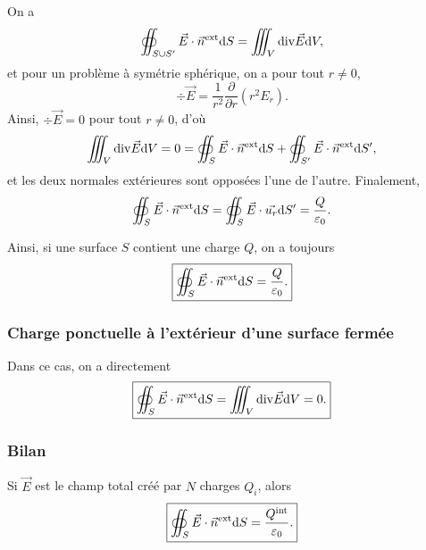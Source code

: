             On a 
            \begin{equation}
                \oiint_{S\cup S'}\vec{E}\cdot\vec{n}^{\text{ext}}\mathrm{d} S=\iiint_{V}\mathrm{div}\vec{E}\mathrm{d} V,
            \end{equation}
            et pour un problème à symétrie sphérique, on a pour tout $r\neq0$,
            \begin{equation}
                \div\vec{E}=\frac{1}{r^{2}}\frac{\partial}{\partial r}\left(r^{2}E_r\right).
            \end{equation}
            Ainsi, $\div\vec{E}=0$ pour tout $r\neq 0$, d'où 
            \begin{align}
                \iiint_{V}\mathrm{div}\vec{E}\mathrm{d} V=0=\oiint_{S}\vec{E}\cdot\vec{n}^{\text{ext}}\mathrm{d} S+\oiint_{S'}\vec{E}\cdot\vec{n}^{\text{ext}}\mathrm{d} S',
            \end{align}
            et les deux normales extérieures sont opposées l'une de l'autre. Finalement,
            \begin{equation}
                \oiint_{S}\vec{E}\cdot\vec{n}^{\text{ext}}\mathrm{d} S=\oiint_{S}\vec{E}\cdot\vec{u_r}\mathrm{d} S'=\frac{Q}{\varepsilon_{0}}.
            \end{equation}

            Ainsi, si une surface $S$ contient une charge $Q$, on a toujours
            \begin{equation}
                \boxed{
                    \oiint_{S}\vec{E}\cdot\vec{n}^{\text{ext}}\mathrm{d} S=\frac{Q}{\varepsilon_{0}}.
                }
            \end{equation}

        \subsubsection{Charge ponctuelle à l'extérieur d'une surface fermée}

            Dans ce cas, on a directement
            \begin{equation}
                \boxed{
                    \oiint_{S}\vec{E}\cdot\vec{n}^{\text{ext}}\mathrm{d} S=\iiint_{V}\mathrm{div}\vec{E}\mathrm{d} V=0.
                }
            \end{equation}

        \subsubsection{Bilan}

            Si $\vec{E}$ est le champ total créé par $N$ charges $Q_i$, alors
            \begin{equation}
                \boxed{
                    \oiint_{S}\vec{E}\cdot\vec{n}^{\text{ext}}\mathrm{d} S=\frac{Q^{\text{int}}}{\varepsilon_{0}}.
                }
            \end{equation}

